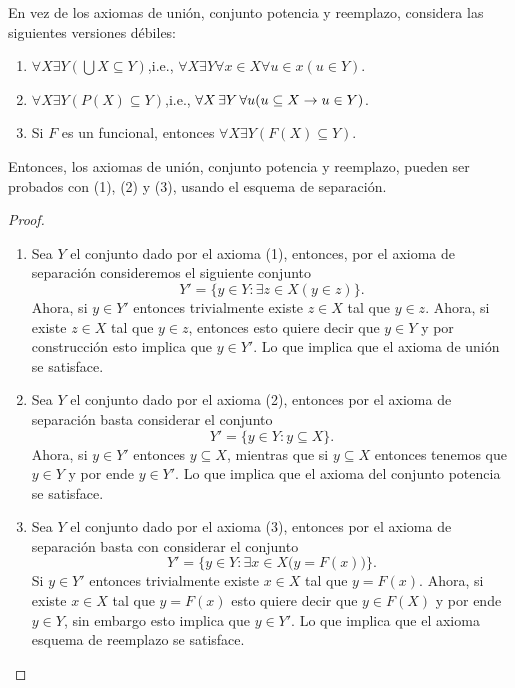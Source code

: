 \begin{exercise}[1.15]
  En vez de los axiomas de unión, conjunto potencia y reemplazo, considera las siguientes versiones débiles:
  \begin{enumerate}[label=(\arabic*)]
    \item $\forall X \exists Y (\bigcup X \subseteq Y)$,\qquad i.e., $\forall X \exists Y  \forall x \in X  \forall u \in x  (u \in Y)$.
    
    \item $\forall X  \exists Y  (P(X) \subseteq Y)$,\qquad i.e., $\forall X \exists Y  \forall u  (u \subseteq X \lthen u \in Y)$.
    
    \item Si $F$ es un funcional, entonces $\forall X  \exists Y  (F(X) \subseteq Y)$.
  \end{enumerate}
  Entonces, los axiomas de unión, conjunto potencia y reemplazo, pueden ser probados con (1), (2) y (3), usando el esquema de separación.
\end{exercise}
\begin{proof}~
  \begin{enumerate}
    \item Sea $Y$ el conjunto dado por el axioma (1), entonces, por el axioma de separación consideremos el siguiente conjunto
    \[
        Y' = \{y \in Y : \exists z \in X (y \in z) \}.
    \]
    Ahora, si $y \in Y'$ entonces trivialmente existe $z \in X$ tal que $y \in z$. Ahora, si existe $z \in X$ tal que $y \in z$, entonces esto quiere decir que $y \in Y$ y por construcción esto implica que $y \in Y'$. Lo que implica que el axioma de unión se satisface.

    \item Sea $Y$ el conjunto dado por el axioma (2), entonces por el axioma de separación basta considerar el conjunto
    \[
      Y' = \{y \in Y : y \subseteq X\}.
    \]
    Ahora, si $y \in Y'$ entonces $y \subseteq X$, mientras que si $y \subseteq X$ entonces tenemos que $y \in Y$ y por ende $y \in Y'$. Lo que implica que el axioma del conjunto potencia se satisface.

    \item Sea $Y$ el conjunto dado por el axioma (3), entonces por el axioma de separación basta con considerar el conjunto
    \[
      Y' = \bigl\{y \in Y : \exists x \in X \bigl( y = F(x) \bigr) \bigr\}.
    \]
    Si $y \in Y'$ entonces trivialmente existe $x \in X$ tal que $y = F(x)$. Ahora, si existe $x \in X$ tal que $y = F(x)$ esto quiere decir que $y \in F(X)$ y por ende $y \in Y$, sin embargo esto implica que $y \in Y'$. Lo que implica que el axioma esquema de reemplazo se satisface.\qedhere
  \end{enumerate}
\end{proof}